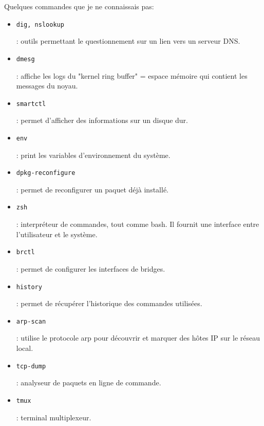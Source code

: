 \documentclass[12pt]{article}
\begin{document}
Quelques commandes que je ne connaissais pas:
\begin{itemize}
    \item \begin{code}\texttt{dig, nslookup}\end{code}: outils permettant le questionnement sur un lien vers un serveur \gls{DNS}. 
    \item \begin{code}\texttt{dmesg}\end{code}: affiche les logs du "kernel ring buffer" = espace mémoire qui contient les messages du noyau.
    \item \begin{code}\texttt{smartctl}\end{code}: permet d'afficher des informations sur un disque dur. 
    \item \begin{code}\texttt{env}\end{code}: print les variables d'environnement du système.
    \item \begin{code}\texttt{dpkg-reconfigure}\end{code}: permet de reconfigurer un paquet déjà installé.
    \item \begin{code}\texttt{zsh}\end{code}: interpréteur de commandes, tout comme bash. 
    Il fournit une interface entre l'utilisateur et le système.
    \item \begin{code}\texttt{brctl}\end{code}: permet de configurer les interfaces de bridges.
    \item \begin{code}\texttt{history}\end{code}: permet de récupérer l'historique des commandes utilisées.
    \item \begin{code}\texttt{arp-scan}\end{code}: utilise le protocole arp pour découvrir et marquer des hôtes \gls{IP} sur le réseau local.
    \item \begin{code}\texttt{tcp-dump}\end{code}: analyseur de paquets en ligne de commande.
    \item \begin{code}\texttt{tmux}\end{code}: terminal multiplexeur.

\end{itemize}
\end{document}
